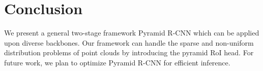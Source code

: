\documentclass[10pt,twocolumn,letterpaper]{article}
\begin{document}
\begin{table}[]
\setlength{\belowcaptionskip}{10pt}
\caption{Effects of different RoI pyramids in Pyramid-PV on the Waymo dataset. Each element in [] stands for the respective parameter of a pyramid level.} \label{table_ablation_2}
\vspace{-2mm}
\end{table}

\begin{table}[]
\setlength{\belowcaptionskip}{10pt}
\caption{Comparisons on the inference speeds of different detection models on the KITTI dataset.} \label{table_ablation_3}
\vspace{-2mm}
\end{table}

\vspace{-1mm}
\section{Conclusion}
\vspace{-1mm}
We present a general two-stage framework Pyramid R-CNN which can be applied upon diverse backbones. Our framework can handle the sparse and non-uniform distribution problems of point clouds by introducing the pyramid RoI head. For future work, we plan to optimize Pyramid R-CNN for efficient inference.
\end{document}

